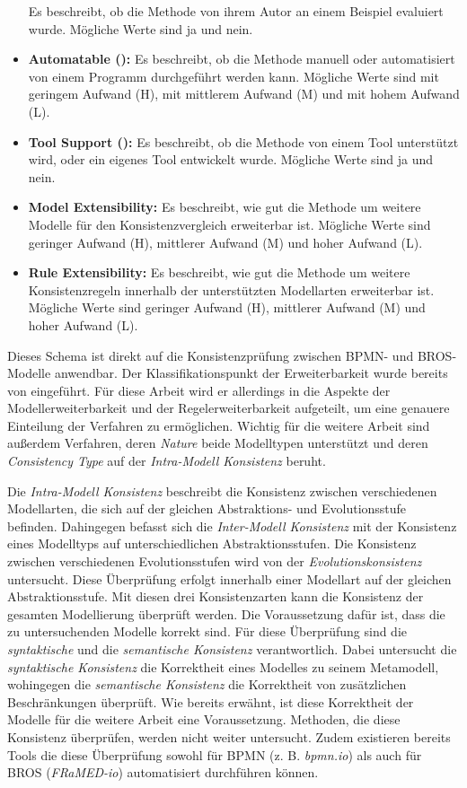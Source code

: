 \begin{itemize}
    Es beschreibt, ob die Methode von ihrem Autor an einem Beispiel evaluiert wurde.
    Mögliche Werte sind ja und nein. 
    \item \textbf{Automatable (\cite{Usman2008}):}
    Es beschreibt, ob die Methode manuell oder automatisiert von einem Programm durchgeführt werden kann.
    Mögliche Werte sind mit geringem Aufwand (H), mit mittlerem Aufwand (M) und mit hohem Aufwand (L).
    \item \textbf{Tool Support (\cite{Usman2008}):}
    Es beschreibt, ob die Methode von einem Tool unterstützt wird, oder ein eigenes Tool entwickelt wurde.
    Mögliche Werte sind ja und nein.
    \item \textbf{Model Extensibility:}
    Es beschreibt, wie gut die Methode um weitere Modelle für den Konsistenzvergleich erweiterbar ist.
    Mögliche Werte sind geringer Aufwand (H), mittlerer Aufwand (M) und hoher Aufwand (L).
    \item \textbf{Rule Extensibility:}
    Es beschreibt, wie gut die Methode um weitere Konsistenzregeln innerhalb der unterstützten Modellarten erweiterbar ist.
    Mögliche Werte sind geringer Aufwand (H), mittlerer Aufwand (M) und hoher Aufwand (L).
\end{itemize}


Dieses Schema ist direkt auf die Konsistenzprüfung zwischen BPMN- und BROS-Modelle anwendbar.
Der Klassifikationspunkt der Erweiterbarkeit wurde bereits von \cite{Lucas2009} eingeführt.
Für diese Arbeit wird er allerdings in die Aspekte der Modellerweiterbarkeit und der Regelerweiterbarkeit aufgeteilt, um eine genauere Einteilung der Verfahren zu ermöglichen.
Wichtig für die weitere Arbeit sind außerdem Verfahren, deren \emph{Nature} beide Modelltypen unterstützt und deren \emph{Consistency Type} auf der \emph{Intra-Modell Konsistenz} beruht.

Die \emph{Intra-Modell Konsistenz} beschreibt die Konsistenz zwischen verschiedenen Modellarten, die sich auf der gleichen Abstraktions- und Evolutionsstufe befinden.
Dahingegen befasst sich die \emph{Inter-Modell Konsistenz} mit der Konsistenz eines Modelltyps auf unterschiedlichen Abstraktionsstufen.
Die Konsistenz zwischen verschiedenen Evolutionsstufen wird von der \emph{Evolutionskonsistenz} untersucht.
Diese Überprüfung erfolgt innerhalb einer Modellart auf der gleichen Abstraktionsstufe.
Mit diesen drei Konsistenzarten kann die Konsistenz der gesamten Modellierung überprüft werden.
Die Voraussetzung dafür ist, dass die zu untersuchenden Modelle korrekt sind.
Für diese Überprüfung sind die \emph{syntaktische} und die \emph{semantische Konsistenz} verantwortlich.
Dabei untersucht die \emph{syntaktische Konsistenz} die Korrektheit eines Modelles zu seinem Metamodell, wohingegen die \emph{semantische Konsistenz} die Korrektheit von zusätzlichen Beschränkungen überprüft.
Wie bereits erwähnt, ist diese Korrektheit der Modelle für die weitere Arbeit eine Voraussetzung.
Methoden, die diese Konsistenz überprüfen, werden nicht weiter untersucht.
Zudem existieren bereits Tools die diese Überprüfung sowohl für BPMN (z. B. \emph{bpmn.io}) als auch für BROS (\emph{FRaMED-io}) automatisiert durchführen können.

